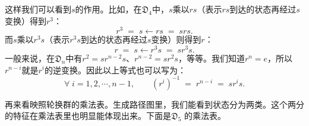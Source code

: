 \documentclass[12pt,UTF8,fontset=none]{ctexbook}
\begin{document}
这样我们可以看到$s$的作用。比如，在$\mathfrak{D}_4$中，$s$乘以$rs$（表示$rs$到达的状态再经过$s$变换）得到$r^3$：
$$ r^3 \;=\; s\leftarrow rs \;=\; s r s. $$
而$s$乘以$r^3s$（表示$r^3s$到达的状态再经过$s$变换）则得到$r$：
$$ r  \;=\; s\leftarrow r^3s \;=\;  s r^3 s. $$
一般来说，在$\mathfrak{D}_n$中有$r^2 = sr^{n-2}s$、$r^{n-2} = sr^2s$，等等。我们知道$r^n = e$，所以$r^{n-i}$就是$r^i$的逆变换。因此以上等式也可以写为：
$$ \forall\;i=1,2,\cdots,n-1,\qquad \left(r^i\right)^{-1} \;=\; r^{n-i} \;=\; sr^is. $$


再来看映照轮换群的乘法表。生成路径图里，我们能看到状态分为两类。这个两分的特征在乘法表里也明显能体现出来。下面是$\mathfrak{D}_5$ 的乘法表。

\setlength{\colwidth}{0.4cm}  %
\renewcommand{\arraystretch}{1.2} %

\end{document}
